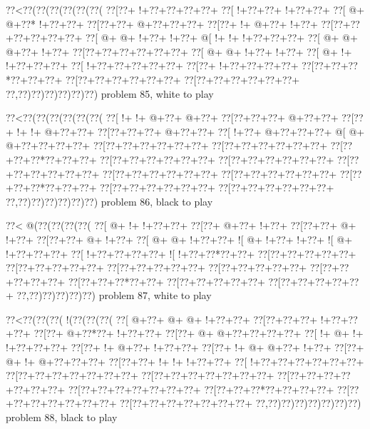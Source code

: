 \vbox{\vbox{\goo
\0??<\0??(\0??(\0??(\0??(\0??(\0??(
\0??[\0??+\- !+\0??+\0??+\0??+\0??+
\0??[\- !+\0??+\0??+\- !+\0??+\0??+
\0??[\- @+\- @+\0??*\- !+\0??+\0??+
\0??[\0??+\0??+\- @+\0??+\0??+\0??+
\0??[\0??+\- !+\- @+\0??+\- !+\0??+
\0??[\0??+\0??+\0??+\0??+\0??+\0??+
\0??[\- @+\- @+\- !+\0??+\- !+\0??+
\- @[\- !+\- !+\- !+\0??+\0??+\0??+
\0??[\- @+\- @+\- @+\0??+\- !+\0??+
\0??[\0??+\0??+\0??+\0??+\0??+\0??+
\0??[\- @+\- @+\- !+\0??+\- !+\0??+
\0??[\- @+\- !+\- !+\0??+\0??+\0??+
\0??[\- !+\0??+\0??+\0??+\0??+\0??+
\0??[\0??+\- !+\0??+\0??+\0??+\0??+
\0??[\0??+\0??+\0??*\0??+\0??+\0??+
\0??[\0??+\0??+\0??+\0??+\0??+\0??+
\0??[\0??+\0??+\0??+\0??+\0??+\0??+
\0??,\0??)\0??)\0??)\0??)\0??)\0??)
}
\hfil problem 85, white to play\hfil\break
}

\vbox{\vbox{\goo
\0??<\0??(\0??(\0??(\0??(\0??(\0??(
\0??[\- !+\- !+\- @+\0??+\- @+\0??+
\0??[\0??+\0??+\0??+\- @+\0??+\0??+
\0??[\0??+\- !+\- !+\- @+\0??+\0??+
\0??[\0??+\0??+\0??+\- @+\0??+\0??+
\0??[\- !+\0??+\- @+\0??+\0??+\0??+
\- @[\- @+\- @+\0??+\0??+\0??+\0??+
\0??[\0??+\0??+\0??+\0??+\0??+\0??+
\0??[\0??+\0??+\0??+\0??+\0??+\0??+
\0??[\0??+\0??+\0??*\0??+\0??+\0??+
\0??[\0??+\0??+\0??+\0??+\0??+\0??+
\0??[\0??+\0??+\0??+\0??+\0??+\0??+
\0??[\0??+\0??+\0??+\0??+\0??+\0??+
\0??[\0??+\0??+\0??+\0??+\0??+\0??+
\0??[\0??+\0??+\0??+\0??+\0??+\0??+
\0??[\0??+\0??+\0??*\0??+\0??+\0??+
\0??[\0??+\0??+\0??+\0??+\0??+\0??+
\0??[\0??+\0??+\0??+\0??+\0??+\0??+
\0??,\0??)\0??)\0??)\0??)\0??)\0??)
}
\hfil problem 86, black to play\hfil\break
}

\vbox{\vbox{\goo
\0??<\- @(\0??(\0??(\0??(\0??(
\0??[\- @+\- !+\- !+\0??+\0??+
\0??[\0??+\- @+\0??+\- !+\0??+
\0??[\0??+\0??+\- @+\- !+\0??+
\0??[\0??+\0??+\- @+\- !+\0??+
\0??[\- @+\- @+\- !+\0??+\0??+
\- ![\- @+\- !+\0??+\- !+\0??+
\- ![\- @+\- !+\0??+\0??+\0??+
\0??[\- !+\0??+\0??+\0??+\0??+
\- ![\- !+\0??+\0??*\0??+\0??+
\0??[\0??+\0??+\0??+\0??+\0??+
\0??[\0??+\0??+\0??+\0??+\0??+
\0??[\0??+\0??+\0??+\0??+\0??+
\0??[\0??+\0??+\0??+\0??+\0??+
\0??[\0??+\0??+\0??+\0??+\0??+
\0??[\0??+\0??+\0??*\0??+\0??+
\0??[\0??+\0??+\0??+\0??+\0??+
\0??[\0??+\0??+\0??+\0??+\0??+
\0??,\0??)\0??)\0??)\0??)\0??)
}
\hfil problem 87, white to play\hfil\break
}

\vbox{\vbox{\goo
\0??<\0??(\0??(\0??(\- !(\0??(\0??(\0??(
\0??[\- @+\0??+\- @+\- @+\- !+\0??+\0??+
\0??[\0??+\0??+\0??+\- !+\0??+\0??+\0??+
\0??[\0??+\- @+\0??*\0??+\- !+\0??+\0??+
\0??[\0??+\- @+\- @+\0??+\0??+\0??+\0??+
\0??[\- !+\- @+\- !+\- !+\0??+\0??+\0??+
\0??[\0??+\- !+\- @+\0??+\- !+\0??+\0??+
\0??[\0??+\- !+\- @+\- @+\0??+\- !+\0??+
\0??[\0??+\- @+\- !+\- @+\0??+\0??+\0??+
\0??[\0??+\0??+\- !+\- !+\- !+\0??+\0??+
\0??[\- !+\0??+\0??+\0??+\0??+\0??+\0??+
\0??[\0??+\0??+\0??+\0??+\0??+\0??+\0??+
\0??[\0??+\0??+\0??+\0??+\0??+\0??+\0??+
\0??[\0??+\0??+\0??+\0??+\0??+\0??+\0??+
\0??[\0??+\0??+\0??+\0??+\0??+\0??+\0??+
\0??[\0??+\0??+\0??*\0??+\0??+\0??+\0??+
\0??[\0??+\0??+\0??+\0??+\0??+\0??+\0??+
\0??[\0??+\0??+\0??+\0??+\0??+\0??+\0??+
\0??,\0??)\0??)\0??)\0??)\0??)\0??)\0??)
}
\hfil problem 88, black to play\hfil\break
}

